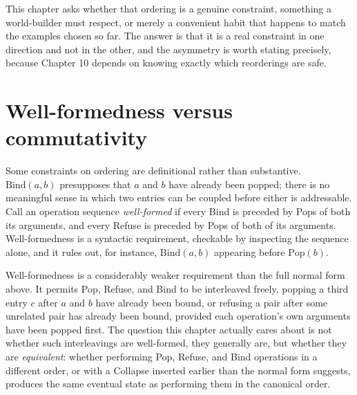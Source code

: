 \documentclass[11pt]{book}
\begin{document}
This chapter asks whether that ordering is a genuine constraint, something a world-builder must respect, or merely a convenient habit that happens to match the examples chosen so far. The answer is that it is a real constraint in one direction and not in the other, and the asymmetry is worth stating precisely, because Chapter 10 depends on knowing exactly which reorderings are safe.

\section{Well-formedness versus commutativity}

Some constraints on ordering are definitional rather than substantive. $\mathrm{Bind}(a,b)$ presupposes that $a$ and $b$ have already been popped; there is no meaningful sense in which two entries can be coupled before either is addressable. Call an operation sequence \emph{well-formed} if every Bind is preceded by Pops of both its arguments, and every Refuse is preceded by Pops of both of its arguments. Well-formedness is a syntactic requirement, checkable by inspecting the sequence alone, and it rules out, for instance, $\mathrm{Bind}(a,b)$ appearing before $\mathrm{Pop}(b)$.

Well-formedness is a considerably weaker requirement than the full normal form above. It permits Pop, Refuse, and Bind to be interleaved freely, popping a third entry $c$ after $a$ and $b$ have already been bound, or refusing a pair after some unrelated pair has already been bound, provided each operation's own arguments have been popped first. The question this chapter actually cares about is not whether such interleavings are well-formed, they generally are, but whether they are \emph{equivalent}: whether performing Pop, Refuse, and Bind operations in a different order, or with a Collapse inserted earlier than the normal form suggests, produces the same eventual state as performing them in the canonical order.
\end{document}
